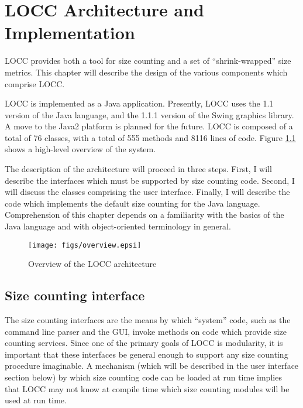 
\chapter{LOCC Architecture and Implementation}
\label{chap:arch}

LOCC provides both a tool for size counting and a set of ``shrink-wrapped'' 
size metrics.  This chapter will describe the design of the
various components which comprise LOCC.

LOCC is implemented as a Java application.  Presently, LOCC uses the 1.1
version of the Java language, and the 1.1.1 version of the Swing graphics
library.  A move to the Java2 platform is planned for the future. LOCC is
composed of a total of 76 classes, with a total of 555 methods and 8116
lines of code.  Figure \ref{fig:overview} shows a high-level overview of
the system.


The description of the architecture will proceed in three steps.
First, I will describe the interfaces which must be supported by size
counting code.  Second, I will discuss the classes comprising the user 
interface.  Finally, I will describe the code which implements the
default size counting for the Java language.
Comprehension of this chapter depends on a
familiarity with the basics of the Java language and with
object-oriented terminology in general.

\begin{figure}
\centering
\texttt{[image: figs/overview.epsi]}
\caption{Overview of the LOCC architecture}
\label{fig:overview}
\end{figure}

\section{Size counting interface}

The size counting interfaces are the means by which ``system'' code,
such as the command line parser and the GUI, invoke methods on code
which provide size counting services.  Since one of the primary goals of
LOCC is modularity, it is important that these interfaces be
general enough to support any size counting procedure imaginable.
A mechanism (which will be described in the user interface section
below) by which size counting code can be loaded at run time implies
that LOCC may not know at compile time which size counting modules
will be used at run time.  

